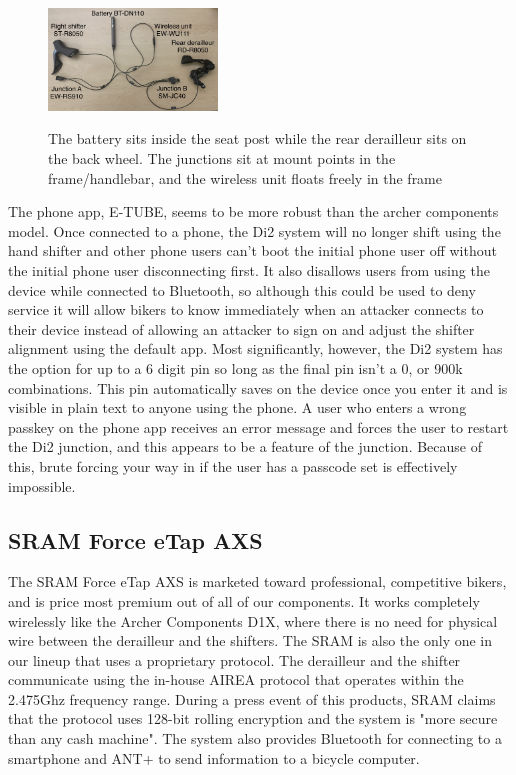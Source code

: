 \documentclass[letterpaper,twocolumn,10pt]{article}
\begin{document}
\begin{figure}[ht]
  \begin{center}
    \centering
    \includegraphics[width=0.4\textwidth]{images/IMG_5264_Di2.jpg}
    \label{fig:Di2Setup}
  \end{center}
  \caption{The battery sits inside the seat post while the rear derailleur sits on the back wheel. The junctions sit at mount points in the frame/handlebar, and the wireless unit floats freely in the frame}
\end{figure}
The phone app, E-TUBE, seems to be more robust than the archer components model. Once connected to a phone, the Di2 system will no longer shift using the hand shifter and other phone users can't boot the initial phone user off without the initial phone user disconnecting first. It also disallows users from using the device while connected to Bluetooth, so although this could be used to deny service it will allow bikers to know immediately when an attacker connects to their device instead of allowing an attacker to sign on and adjust the shifter alignment using the default app. Most significantly, however, the Di2 system has the option for up to a 6 digit pin so long as the final pin isn't a 0, or 900k combinations. This pin automatically saves on the device once you enter it and is visible in plain text to anyone using the phone. A user who enters a wrong passkey on the phone app receives an error message and forces the user to restart the Di2 junction, and this appears to be a feature of the junction. Because of this, brute forcing your way in if the user has a passcode set is effectively impossible.

\subsection{SRAM Force eTap AXS}
The SRAM Force eTap AXS \cite{etap} is marketed toward professional, competitive bikers, and is price most premium out of all of our components. It works completely wirelessly like the Archer Components D1X, where there is no need for physical wire between the derailleur and the shifters. The SRAM is also the only one in our lineup that uses a proprietary protocol. The derailleur and the shifter communicate using the in-house AIREA protocol that operates within the 2.475Ghz frequency range. During a press event of this products, SRAM claims that  the protocol uses 128-bit rolling encryption and the system is "more secure than any cash machine".\cite{phillips2015SRAM} The system also provides Bluetooth for connecting to a smartphone and ANT+ to send information to a bicycle computer.
\end{document}

